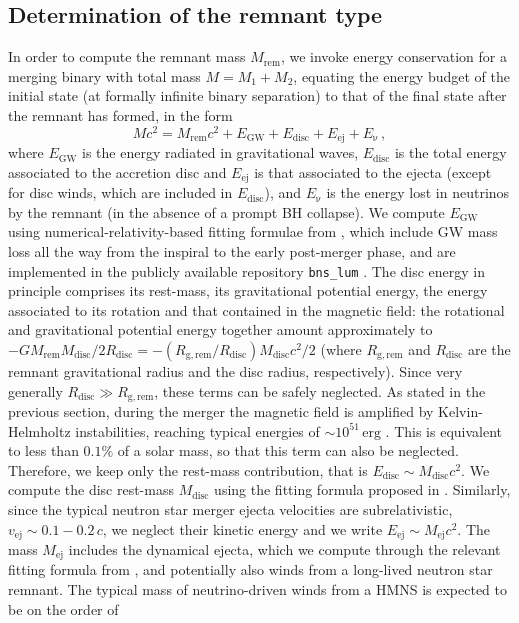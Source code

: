 \documentclass[]{aa}
\newcommand{\resp}[1]{#1}
\begin{document}
\subsection{Determination of the remnant type}\label{sec:remnant_determination}

In order to compute the remnant mass $M_\mathrm{rem}$, we invoke energy conservation for a merging binary with total mass $M=M_1+M_2$, \resp{equating the energy budget of the initial state (at formally infinite binary separation) to that of the final state after the remnant has formed}, in the form
\begin{equation}
 M c^2 = M_\mathrm{rem}c^2 + E_\mathrm{GW} +  E_\mathrm{disc} + E_\mathrm{ej} + E_\mathrm{\nu}
 \label{eq:binary_energy_cons}\, ,
\end{equation}
where $E_\mathrm{GW}$ is the energy radiated in gravitational waves, $E_\mathrm{disc}$ is the total energy associated to the accretion disc and $E_\mathrm{ej}$ is that associated to the ejecta (except for disc winds, which are included in $E_\mathrm{disc}$), and $E_\mathrm{\nu}$ is the energy lost in neutrinos by the remnant (in the absence of a prompt BH collapse). We compute $E_\mathrm{GW}$ using numerical-relativity-based fitting formulae from \cite{Zappa2018}, which include GW mass loss all the way from the inspiral to the early post-merger phase, and are implemented in the publicly available repository \texttt{bns\_lum} \citep{bns_lum}.  The disc energy in principle comprises its rest-mass, its gravitational potential energy, the energy associated to its rotation and \resp{that contained in the magnetic field}: the rotational and gravitational potential energy together amount approximately to $-G M_\mathrm{rem}M_\mathrm{disc}/2 R_\mathrm{disc} = - (R_\mathrm{g,rem}/R_\mathrm{disc})M_\mathrm{disc}c^2/2$ (where $R_\mathrm{g,rem}$ and $R_\mathrm{disc}$ are the remnant gravitational radius and the disc radius, respectively). Since very generally $R_\mathrm{disc}\gg R_\mathrm{g,rem}$, these terms can be safely neglected. \resp{As stated in the previous section, during the merger the magnetic field is amplified by Kelvin-Helmholtz instabilities, reaching typical energies of $\sim 10^{51}\,\mathrm{erg}$ \citep{Aguilera-Miret2020}. This is equivalent to less than $0.1\%$ of a solar mass, so that this term can also be neglected. Therefore, we keep} only the rest-mass contribution, that is $E_\mathrm{disc}\sim M_\mathrm{disc} c^2$. We compute the disc rest-mass $M_\mathrm{disc}$ using the fitting formula proposed in \citep[][\resp{their eq.~4, with their best-fit parameters, to which we refer hereafter as $M_\mathrm{disc,KF20}$}]{Kruger2020}. Similarly, since the typical neutron star merger ejecta velocities are subrelativistic, $v_\mathrm{ej}\sim 0.1-0.2\,c$, we neglect their kinetic energy and we write $E_\mathrm{ej}\sim M_\mathrm{ej}c^2$. The mass $M_\mathrm{ej}$ includes the dynamical ejecta, which we compute through the relevant fitting formula from \citep[][\resp{their eq.~6, with their best-fit coefficients}]{Kruger2020}, and  potentially also winds from a long-lived neutron star remnant. The typical mass of neutrino-driven winds from a HMNS is expected \citep{Dessart2009,Perego2014} to be on the order of 
\end{document}
